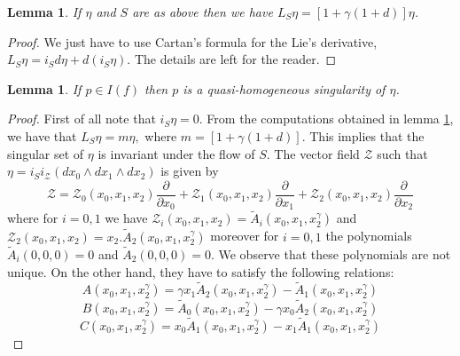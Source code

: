 \documentclass{amsart}
\newtheorem{lemma}[theorem]{Lemma}
\theoremstyle{definition}
\theoremstyle{proposition}
\numberwithin{equation}{section}
\theoremstyle{main}
\begin{document}
\begin{lemma}\label{liecartan} If $\eta$ and $S$ are as above
then we have  $L_{S}\eta=[1+\gamma(1+d)]\eta$.
\end{lemma}

\begin{proof} We just have to use Cartan's formula for the Lie's derivative, $L_{S}\eta=i_Sd\eta+d(i_S\eta)$. The details are left for the reader.
\end{proof}
\begin{lemma} \label{lema5.6}If $p\in I(f)$ then $p$ is a quasi-homogeneous singularity of $\eta$.    \end{lemma} 
  \begin{proof}
First of all note that $i_{S}\eta=0$. From the computations  obtained in lemma \ref{liecartan}, we have that $L_{S}\eta=m\eta,$ where $m=[1+\gamma(1+d)]$. This implies that the singular set of $\eta$ is invariant under the flow of $S$.  
The vector field $\mathcal Z$ such that $\eta=i_{S}i_{\mathcal Z}(dx_0 \wedge dx_{1} \wedge dx_{2})$ is given by
$$\mathcal Z=\mathcal Z_{0}(x_{0},x_{1},x_{2}) \frac{\partial}{\partial x_{0}}+ \mathcal Z_{1}(x_{0},x_{1},x_{2}) \frac{\partial}{\partial x_{1}}+ \mathcal Z_{2}(x_{0},x_{1},x_{2}) \frac{\partial}{\partial x_{2}}$$
where for $i=0,1$ we have $\mathcal Z_{i}(x_{0},x_{1},x_{2})= \tilde{A}_{i}(x_{0},x_{1},x^{\gamma} _{2})$  and $\mathcal Z_{2}(x_{0},x_{1},x_{2})= x_{2}.\tilde{A}_{2}(x_{0},x_{1},x^{\gamma} _{2})$ moreover for $i=0,1$ the polynomials $\tilde A_{i}(0,0,0)=0$ and $\tilde A_{2}(0,0,0)=0$.  
We observe that these polynomials are not unique. On the other hand, they have to satisfy the following relations:
\begin{equation*}\label{polinômios 1}
A(x_{0},x_{1},x^{\gamma} _{2})=\gamma x_1\tilde{A}_{2}(x_{0},x_{1},x^{\gamma} _{2})-\tilde A_{1}(x_{0},x_{1},x^{\gamma} _{2})
\end{equation*}
\begin{equation*}\label{polinômios 2}
B(x_{0},x_{1},x^{\gamma} _{2})=\tilde{A}_{0}(x_{0},x_{1},x^{\gamma} _{2})-\gamma x_{0}\tilde A_{2}(x_{0},x_{1},x^{\gamma} _{2})
\end{equation*}
\begin{equation*}\label{polinômios 3}
C(x_{0},x_{1},x^{\gamma} _{2})= x_{0}\tilde{A}_{1}(x_{0},x_{1},x^{\gamma} _{2})-x_{1}\tilde A_{1}(x_{0},x_{1},x^{\gamma} _{2})
\end{equation*}


\end{proof}
\end{document}
